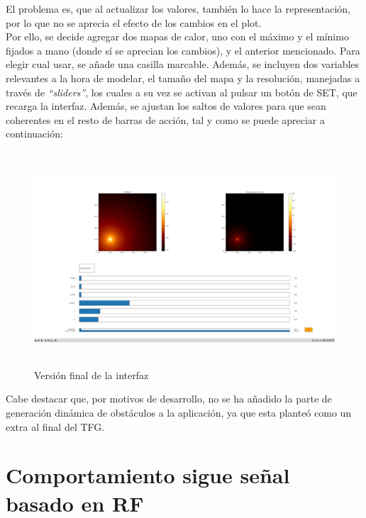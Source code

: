 El problema es, que al actualizar los valores, también lo hace la representación, por lo que no se aprecia el efecto de los cambios en el plot.\\

Por ello, se decide agregar dos mapas de calor, uno con el máximo y el mínimo fijados a mano (donde sí se aprecian los cambios), y el anterior mencionado. Para elegir cual usar, se añade una casilla marcable. Además, se incluyen dos variables relevantes a la hora de modelar, el tamaño del mapa y la resolución, manejadas a través de \emph{``sliders''}, los cuales a su vez se activan al pulsar un botón de SET, que recarga la interfaz. Además, se ajustan los saltos de valores para que sean coherentes en el resto de barras de acción, tal y como se puede apreciar a continuación:\\

\begin{figure} [H]
    \begin{center}
    \includegraphics[height=8cm]{imagenes/cap4/7_Friss_endGUI.png}
    \end{center}
	\caption[Versión final de la interfaz]{Versión final de la interfaz}
	\label{fig:friis_end_app}
\end{figure}

Cabe destacar que, por motivos de desarrollo, no se ha añadido la parte de generación dinámica de obstáculos a la aplicación, ya que esta planteó como un extra al final del \ac{TFG}.\\

\section{Comportamiento sigue señal basado en \ac{RF}}
\label{sec:signal_follow}

